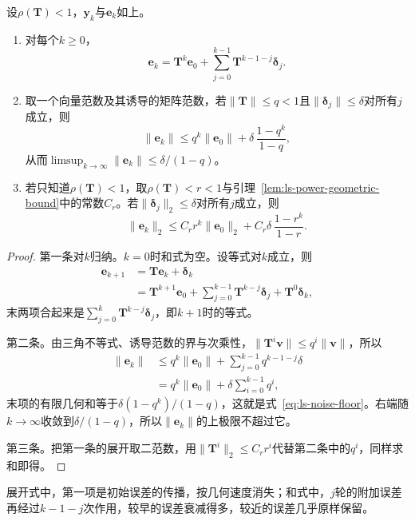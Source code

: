 \begin{theorem}[逐步误差的累积]
\label{thm:ls-accumulated-step-errors}
设$\rho(\bm T)<1$，$\bm y_k$与$\bm e_k$如上。
\begin{enumerate}
 \item 对每个$k\geq0$，
 \begin{equation}
  \bm e_k=\bm T^k\bm e_0+\sum_{j=0}^{k-1}\bm T^{k-1-j}\bm\delta_j .
  \label{eq:ls-accumulated-step-errors}
 \end{equation}
 \item 取一个向量范数及其诱导的矩阵范数，若$\lVert\bm T\rVert\leq q<1$且$\lVert\bm\delta_j\rVert\leq\delta$对所有$j$成立，则
 \begin{equation}
  \lVert\bm e_k\rVert\leq q^k\lVert\bm e_0\rVert+\delta\,\frac{1-q^k}{1-q},
  \label{eq:ls-noise-floor}
 \end{equation}
 从而$\limsup_{k\to\infty}\lVert\bm e_k\rVert\leq\delta/(1-q)$。
 \item 若只知道$\rho(\bm T)<1$，取$\rho(\bm T)<r<1$与引理~\ref{lem:ls-power-geometric-bound}中的常数$C_r$。若$\lVert\bm\delta_j\rVert_2\leq\delta$对所有$j$成立，则
 \begin{equation}
  \lVert\bm e_k\rVert_2\leq C_rr^k\lVert\bm e_0\rVert_2+C_r\delta\,\frac{1-r^k}{1-r}.
  \label{eq:ls-noise-floor-nonnormal}
 \end{equation}
\end{enumerate}
\end{theorem}
\begin{proof}
第一条对$k$归纳。$k=0$时和式为空。设等式对$k$成立，则
\[
\begin{aligned}
 \bm e_{k+1}&=\bm T\bm e_k+\bm\delta_k\\
 &=\bm T^{k+1}\bm e_0+\sum_{j=0}^{k-1}\bm T^{k-j}\bm\delta_j+\bm T^0\bm\delta_k ,
\end{aligned}
\]
末两项合起来是$\sum_{j=0}^{k}\bm T^{k-j}\bm\delta_j$，即$k+1$时的等式。

第二条。由三角不等式、诱导范数的界与次乘性，$\lVert\bm T^i\bm v\rVert\leq q^i\lVert\bm v\rVert$，所以
\[
\begin{aligned}
 \lVert\bm e_k\rVert&\leq q^k\lVert\bm e_0\rVert+\sum_{j=0}^{k-1}q^{k-1-j}\delta\\
 &=q^k\lVert\bm e_0\rVert+\delta\sum_{i=0}^{k-1}q^i ,
\end{aligned}
\]
末项的有限几何和等于$\delta(1-q^k)/(1-q)$，这就是式~\eqref{eq:ls-noise-floor}。右端随$k\to\infty$收敛到$\delta/(1-q)$，所以$\lVert\bm e_k\rVert$的上极限不超过它。

第三条。把第一条的展开取二范数，用$\lVert\bm T^i\rVert_2\leq C_rr^i$代替第二条中的$q^i$，同样求和即得。
\end{proof}
展开式中，第一项是初始误差的传播，按几何速度消失；和式中，$j$轮的附加误差再经过$k-1-j$次作用，较早的误差衰减得多，较近的误差几乎原样保留。

